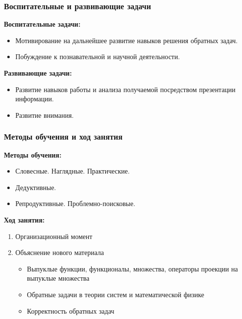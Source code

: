 \documentclass[compress, 9pt]{beamer}
\begin{document}
\begin{refsection}
\begin{frame}
    \end{frame}

    \begin{frame}\frametitle{Воспитательные и развивающие задачи}

        \textbf{Воспитательные задачи:}

        \begin{itemize}\justifying
            \item Мотивирование на дальнейшее развитие навыков решения обратных задач.
            \item Побуждение к познавательной и научной деятельности.
        \end{itemize}

        \textbf{Развивающие задачи:}

        \begin{itemize}\justifying
            \item Развитие навыков работы и анализа получаемой посредством презентации информации.
            \item Развитие внимания.
        \end{itemize}

    \end{frame}

    \begin{frame}\frametitle{Методы обучения и ход занятия}

        \textbf{Методы обучения:}

        \begin{itemize}\justifying
            \item Словесные. Наглядные. Практические.
            \item Дедуктивные.
            \item Репродуктивные. Проблемно-поисковые.
        \end{itemize}

        \textbf{Ход занятия:}

        \begin{enumerate}\justifying
            \item Организационный момент
            \item Объяснение нового материала
            \begin{itemize}\justifying
                \item Выпуклые функции, функционалы, множества, операторы проекции на выпуклые множества
                \item Обратные задачи в теории систем и математической физике
                \item Корректность обратных задач
            \end{itemize}
        \end{enumerate}


\end{frame}
\end{refsection}
\end{document}
